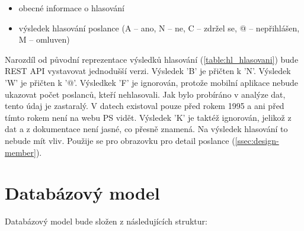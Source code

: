 \begin{itemize}
\item obecné informace o hlasování
\item výsledek hlasování poslance (A -- ano, N -- ne, C -- zdržel se, @ -- nepřihlášen, M -- omluven)
\end{itemize}

\noindent Narozdíl od původní reprezentace výsledků hlasování (\ref{table:hl_hlasovani}) bude REST API vystavovat jednodušší verzi. Výsledek 'B' je přičten k 'N'. Výsledek 'W' je přičten k '@'. Výsledkek 'F' je \linebreak ignorován, protože mobilní aplikace nebude ukazovat počet poslanců, kteří nehlasovali. Jak bylo probíráno v analýze dat, tento údaj je zastaralý. V datech existoval pouze před rokem 1995 a ani před tímto rokem není na webu PS vidět. Výsledek 'K' je taktéž ignorován, jelikož z dat \linebreak a z dokumentace není jasné, co přesně znamená. Na výsledek hlasování to nebude mít vliv. Použije se pro obrazovku pro detail poslance (\ref{ssec:design-member}).

\section{Databázový model}
\label{sec:database_model}

Databázový model bude složen z následujících struktur:

